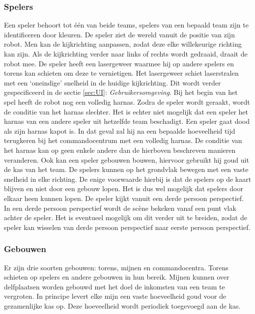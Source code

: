 \documentclass[a4paper,11pt, twoside]{article}
\begin{document}
    \subsubsection{Spelers}
    Een speler behoort tot \'e\'en van beide teams, spelers van een bepaald team zijn te identificeren door kleuren. De speler ziet de wereld vanuit de positie van zijn robot. Men kan de kijkrichting aanpassen, zodat deze elke willekeurige richting kan zijn. Als de kijkrichting verder naar links of rechts wordt gedraaid, draait de robot mee. De speler heeft een lasergeweer waarmee hij op andere spelers en torens kan schieten om deze te vernietigen. Het lasergeweer schiet laserstralen met een `oneindige' snelheid in de huidige kijkrichting. Dit wordt verder gespecificeerd in de sectie \ref{sec:UI}: \emph{Gebruikersomgeving}. Bij het begin van het spel heeft de robot nog een volledig harnas. Zodra de speler wordt geraakt, wordt de conditie van het harnas slechter. Het is echter niet mogelijk dat een speler het harnas van een andere speler uit hetzelfde team beschadigt.
    \FloatBarrier
    Een speler gaat dood als zijn harnas kapot is. In dat geval zal hij na een bepaalde hoeveelheid tijd terugkeren bij het commandocentrum met een volledig harnas. De conditie van het harnas kan op geen enkele andere dan de hierboven beschreven manieren veranderen. Ook kan een speler gebouwen bouwen, hiervoor gebruikt hij goud uit de kas van het team. De spelers kunnen op het grondvlak bewegen met een vaste snelheid in elke richting. De enige voorwaarde hierbij is dat de spelers op de kaart blijven en niet door een gebouw lopen. Het is dus wel mogelijk dat spelers door elkaar heen kunnen lopen. De speler kijkt vanuit een derde persoon perspectief. In een derde persoon perspectief wordt de sc\`ene bekeken vanaf een punt vlak achter de speler. Het is eventueel mogelijk om dit verder uit te breiden, zodat de speler kan wisselen van derde persoon perspectief naar eerste persoon perspectief.

    \subsubsection{Gebouwen}
    Er zijn drie soorten gebouwen: torens, mijnen en commandocentra. Torens schieten op spelers en andere gebouwen in hun bereik. Mijnen kunnen over delfplaatsen worden gebouwd met het doel de inkomsten van een team te vergroten. In principe levert elke mijn een vaste hoeveelheid goud voor de gezamenlijke kas op. Deze hoeveelheid wordt periodiek toegevoegd aan de kas.
\end{document}
